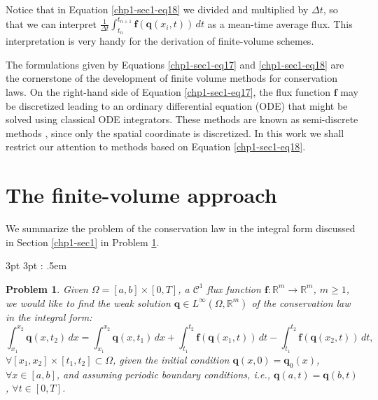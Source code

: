 Notice that in Equation \eqref{chp1-sec1-eq18} we divided and multiplied by $\Delta t$, so that 
we can interpret $\frac{1}{\Delta t}\int_{t_n}^{t_{n+1}}
\mathbf{f}(\mathbf{q}(x_{i}, t)) \,dt $ as a mean-time average flux.
This interpretation is very handy for the derivation of finite-volume schemes.

The formulations given by Equations \eqref{chp1-sec1-eq17} and \eqref{chp1-sec1-eq18} are the cornerstone 
of the development of finite volume methods for conservation laws. 
On the right-hand side of Equation \eqref{chp1-sec1-eq17}, the flux function $\mathbf{f}$ 
may be discretized leading to an ordinary differential equation (ODE)
that might be solved using classical ODE integrators. 
These methods are known as semi-discrete methods \citep{leveque:2002}, since only the spatial coordinate is discretized.
In this work we shall restrict our attention to methods based on Equation \eqref{chp1-sec1-eq18}.

\section{The finite-volume approach}
\label{chp1-sec2}
We summarize the problem of the conservation law in the integral form 
discussed in Section \ref{chp1-sec1} in Problem \ref{chp1-sec2-prob1}.

{3pt} %
{3pt} %
{\itshape} %
{} %
{\bfseries} %
{:} %
{.5em} %
{ } %

\theoremstyle{problem} %
\newtheorem{prob}{Problem}

\begin{prob}
	\label{chp1-sec2-prob1}
	Given $ \Omega = [a,b] \times [0,T]$, a $\mathcal{C}^1$ 
	flux function $\mathbf{f}: \mathbb{R}^m \to \mathbb{R}^m $,
	$m \geq 1$, we would like to find the weak solution
	$ \mathbf{q} \in L^{\infty}(\Omega, \mathbb{R}^m)$ 
	of the conservation law in the integral form:
	\begin{equation*}
	        \int_{x_1}^{x_2} \mathbf{q}(x, t_2) \,dx = 
       		\int_{x_1}^{x_2} \mathbf{q}(x, t_1) \,dx + 
        	\int_{t_1}^{t_2} \mathbf{f}(\mathbf{q}(x_1, t)) \,dt -
		\int_{t_1}^{t_2}\mathbf{f}(\mathbf{q}(x_2, t)) \,dt ,
	\end{equation*}
	$\forall [x_1, x_2]\times[t_1, t_2] \subset \Omega$, 
	given the initial condition 
	$\mathbf{q}(x,0) = \mathbf{q}_0(x)$, $\forall x \in [a,b]$, 
	and assuming periodic boundary conditions, 
	\textit{i.e.}, $\mathbf{q}(a,t) = \mathbf{q}(b,t)$, $\forall t \in [0,T]$.
\end{prob}

